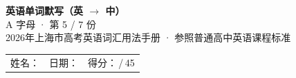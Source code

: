 \documentclass[10pt,a4paper]{article}
\begin{document}
\pagestyle{plain}

\begin{center}
{\LARGE\bfseries 英语单词默写（英 $\to$ 中）}\\[0.22em]
{\large A 字母 · 第 5 / 7 份}\\[0.18em]
{\small 2026年上海市高考英语词汇用法手册 · 参照普通高中英语课程标准}
\end{center}

\vspace{0.25em}
\noindent\begin{tabular}{@{}p{}@{}p{}@{}p{}@{}}
姓名：\underline{\hspace{2.0cm}} & 日期：\underline{\hspace{2.0cm}} & 得分：\underline{\hspace{1.3cm}}\,/\,45 \\
\end{tabular}

\vspace{0.3em}

\vspace{0.08em}
\end{document}
